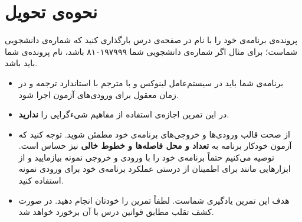 \documentclass{utap}
\begin{document}
\section{نحوه‌ی تحویل}
    پرونده‌ی برنامه‌ی خود را با نام  در صفحه‌ی  درس بارگذاری کنید که  شماره‌ی دانشجویی شماست؛ برای مثال اگر شماره‌ی دانشجویی شما ۸۱۰۱۹۷۹۹۹ باشد، نام پرونده‌ی شما باید  باشد.
    \begin{itemize}
        \item
برنامه‌ی شما باید در سیستم‌عامل لینوکس و با مترجم  با استاندارد  ترجمه و در زمان معقول برای ورودی‌های آزمون اجرا شود.
        \item
در این تمرین اجازه‌ی استفاده از مفاهیم شیءگرایی را \textbf{ندارید}.
        \item
از صحت قالب ورودی‌ها و خروجی‌های برنامه‌ی خود مطمئن شوید. توجه کنید که آزمون خودکار برنامه به \textbf{تعداد و محل فاصله‌ها و خطوط خالی} نیز حساس است. توصیه می‌کنیم حتماً برنامه‌ی خود را با ورودی و خروجی نمونه بیازمایید و از ابزارهایی مانند  برای اطمینان از درستی عملکرد برنامه‌ی خود برای ورودی نمونه استفاده کنید.
        \item
هدف این تمرین یادگیری شماست. لطفاً تمرین را خودتان انجام دهید. در صورت کشف تقلب مطابق قوانین درس با آن برخورد خواهد شد.
    \end{itemize}
\end{document}
